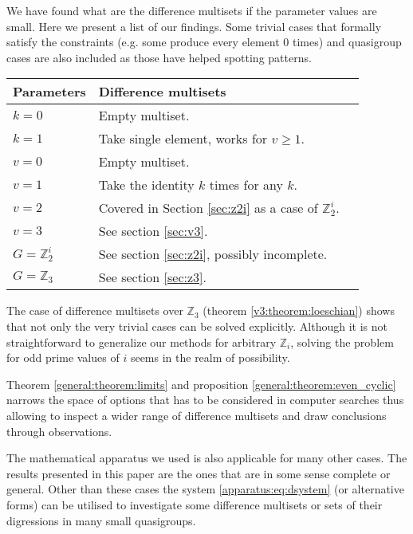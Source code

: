 We have found what are the difference multisets if the parameter values are small. Here we present a list of our findings. Some trivial cases that formally satisfy the constraints (e.g. some produce every element 0 times) and quasigroup cases are also included as those have helped spotting patterns.

\begin{tabular}{llr}
\toprule
    Parameters & Difference multisets \\
\midrule
    $k = 0$ & Empty multiset. \\
    $k = 1$ & Take single element, works for $v \geq 1$. \\
    $v = 0$ & Empty multiset. \\
    $v = 1$ & Take the identity $k$ times for any $k$. \\
    $v = 2$ & Covered in Section \ref{sec:z2i} as a case of $\mathbb Z_2^i$. \\
    $v = 3$ & See section \ref{sec:v3}. \\
    $G=\mathbb Z_2^i$ & See section \ref{sec:z2i}, possibly incomplete. \\
    $G=\mathbb Z_3$ & See section \ref{sec:z3}. \\
\bottomrule
\end{tabular}


The case of difference multisets over $\mathbb Z_3$ 
(theorem \ref{v3:theorem:loeschian}) shows that not only the very 
trivial cases can be solved explicitly. Although it is not 
straightforward to generalize our methods for arbitrary $\mathbb Z_i$, 
solving the problem for odd prime values of $i$ seems in the realm of 
possibility.

Theorem \ref{general:theorem:limits} and proposition \ref{general:theorem:even_cyclic}
narrows the space of options that has to be considered in computer 
searches thus allowing to inspect a wider range of difference multisets
and draw conclusions through observations.

The mathematical apparatus we used is also applicable for many other 
cases. The results presented in this paper are the ones that are in some 
sense complete or general. Other than these cases the system 
\eqref{apparatus:eq:dsystem} (or alternative forms) can be utilised to 
investigate some difference multisets or sets of their digressions in many 
small quasigroups.

